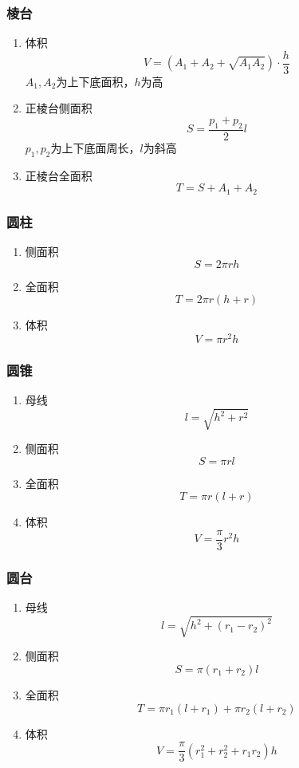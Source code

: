 \documentclass[a4paper]{article}
\begin{document}
\subsubsection{棱台}

\begin{enumerate}
	\item 体积
	$$V=(A_1+A_2+\sqrt{A_1A_2}) \cdot \frac{h}{3}$$
	$A_1,A_2$为上下底面积，$h$为高
	\item 正棱台侧面积
	$$S=\frac{p_1+p_2}{2}l$$
	$p_1,p_2$为上下底面周长，$l$为斜高
	\item 正棱台全面积
	$$T=S+A_1+A_2$$
\end{enumerate}

\subsubsection{圆柱}

\begin{enumerate}
	\item 侧面积
	$$S=2\pi rh$$
	\item 全面积
	$$T=2\pi r(h+r)$$
	\item 体积
	$$V=\pi r^2h$$
\end{enumerate}

\subsubsection{圆锥}

\begin{enumerate}
	\item 母线
	$$l=\sqrt{h^2+r^2}$$
	\item 侧面积
	$$S=\pi rl$$
	\item 全面积
	$$T=\pi r(l+r)$$
	\item 体积
	$$V=\frac{\pi}{3} r^2h$$
\end{enumerate}

\subsubsection{圆台}

\begin{enumerate}
	\item 母线
	$$l=\sqrt{h^2+(r_1-r_2)^2}$$
	\item 侧面积
	$$S=\pi(r_1+r_2)l$$
	\item 全面积
	$$T=\pi r_1(l+r_1)+\pi r_2(l+r_2)$$
	\item 体积
	$$V=\frac{\pi}{3}(r_1^2+r_2^2+r_1r_2)h$$
\end{enumerate}
\end{document}
